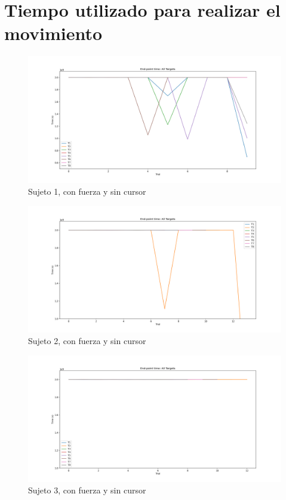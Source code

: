 \documentclass[a4paper,11pt, oneside]{book}
\begin{document}
\section{Tiempo utilizado para realizar el movimiento}
\label{anexo:8}
\begin{figure}[H]
	\includegraphics[width=\linewidth]{sujeto1/force_no_cursor/evolution_time}
	\caption{Sujeto 1, con  fuerza y sin cursor}
	\label{1-4-3}
\end{figure}
\begin{figure}[H]
	\includegraphics[width=\linewidth]{sujeto2/force_no_cursor/evolution_time}
	\caption{Sujeto 2, con  fuerza y sin cursor}
	\label{2-4-3}
\end{figure}
\begin{figure}[H]
	\includegraphics[width=\linewidth]{sujeto3/force_no_cursor/evolution_time}
	\caption{Sujeto 3, con  fuerza y sin cursor}
	\label{3-4-3}
\end{figure}
\end{document}
